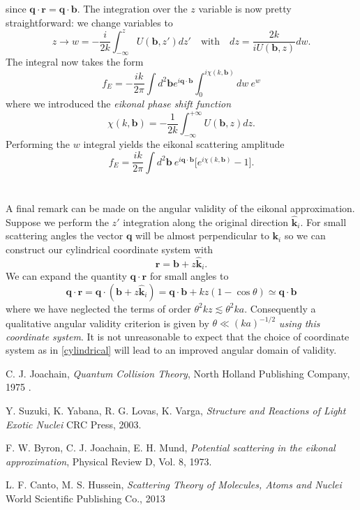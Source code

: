 \documentclass[11pt]{article}
\numberwithin{equation}{section}
\begin{document}
since $\mathbf{q}\cdot\mathbf{r} = \mathbf{q}\cdot\mathbf{b}$. The integration over the $z$ variable is now pretty straightforward: we change variables to
\begin{equation}
	z \rightarrow w = -\frac{i}{2k}\int^z_{-\infty} U(\mathbf{b},z')dz' \quad \text{with} \quad dz = \frac{2k}{iU(\mathbf{b},z)}dw.
\end{equation}
The integral now takes the form
\begin{equation}
	f_E = -\frac{ik}{2\pi} \int d^2\mathbf{b} e^{i\mathbf{q}\cdot \mathbf{b}} \int^{i\chi(k,\mathbf{b})}_0 dw ~e^w
\end{equation}
where we introduced the \emph{eikonal phase shift function}
\begin{equation}
	\chi(k,\mathbf{b}) =  -\frac{1}{2k}\int^{+\infty}_{-\infty} U(\mathbf{b},z)dz.
\end{equation}
Performing the $w$ integral yields the eikonal scattering amplitude
\begin{equation}
	f_E = \frac{ik}{2\pi} \int d^2\mathbf{b} ~e^{i\mathbf{q}\cdot \mathbf{b}} \lbrack e^{i\chi(k,\mathbf{b})} - 1\rbrack.
\end{equation}\\
\\
A final remark can be made on the angular validity of the eikonal approximation. Suppose we perform the $z'$ integration along the original direction $\mathbf{\hat{k}}_i$. For small scattering angles the vector $\mathbf{q}$ will be almost perpendicular to $\mathbf{k}_i$ so we can construct our cylindrical coordinate system with
\begin{equation}
	\mathbf{r} = \mathbf{b} + z\mathbf{\hat{k}}_i.
\end{equation}
We can expand the quantity $\mathbf{q}\cdot \mathbf{r}$ for small angles to
\begin{equation}
	\mathbf{q}\cdot \mathbf{r} = \mathbf{q}\cdot (\mathbf{b} + z\mathbf{\hat{k}}_i) = \mathbf{q}\cdot \mathbf{b} + kz(1-\cos\theta) \simeq \mathbf{q}\cdot \mathbf{b}
\end{equation}
where we have neglected the terms of order $\theta^2 kz \lesssim \theta^2 ka$. Consequently a qualitative angular validity criterion is given by $\theta \ll (ka)^{-1/2}$ \emph{using this coordinate system}. It is not unreasonable to expect that the choice of coordinate system as in \eqref{cylindrical} will lead to an improved angular domain of validity.
\begin{thebibliography}{10}

C. J. Joachain,
\emph{Quantum Collision Theory},
North Holland Publishing Company,
1975
.

Y. Suzuki, K. Yabana, R. G. Lovas, K. Varga,
\emph{Structure and Reactions of Light Exotic Nuclei}
CRC Press,
2003.

F. W. Byron, C. J. Joachain, E. H. Mund,
\emph{Potential scattering in the eikonal approximation},
Physical Review D, Vol. 8,
1973.

L. F. Canto, M. S. Hussein,
\emph{Scattering Theory of Molecules, Atoms and Nuclei}
World Scientific Publishing Co.,
2013


\end{thebibliography}
\end{document}
